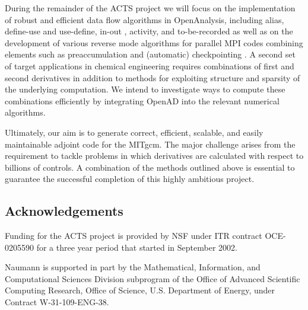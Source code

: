 \documentclass{article}
\begin{document}
During the remainder of the ACTS project we will focus on the implementation
of robust and efficient data flow algorithms in OpenAnalysis, including alias, 
define-use and use-define, in-out \cite{Muc97}, 
activity, and to-be-recorded \cite{HNP02} as well as on 
the development of various reverse mode algorithms for parallel MPI codes
combining elements such as preaccumulation and (automatic) checkpointing
\cite{Gri92}. 
A second set of target 
applications in chemical engineering \cite{FTB97} requires combinations of first and 
second derivatives in addition to methods for exploiting structure and sparsity
of the underlying computation. We intend to investigate ways to compute these
combinations efficiently by integrating OpenAD into the relevant 
numerical algorithms.

Ultimately, our aim is to generate correct, efficient, scalable, and easily 
maintainable adjoint code for the MITgcm. The major challenge arises from the
requirement to tackle problems in which derivatives are calculated with respect 
to billions of controls. A combination of the methods outlined above is 
essential to guarantee the successful completion of this highly ambitious
project.

\subsection*{Acknowledgements}

Funding for the ACTS project is provided by NSF under ITR contract OCE-0205590
for a three year period that started in September 2002.

Naumann is supported in part by the Mathematical, Information, and Computational
Sciences Division subprogram of the Office of Advanced Scientific Computing
Research, Office of Science, U.S. Department of Energy, under Contract
W-31-109-ENG-38.





\end{document}
